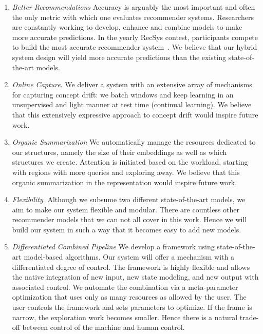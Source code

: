 \begin{enumerate}
    \item \emph{Better Recommendations}
    Accuracy is arguably the most important and often the only metric with which one evaluates recommender systems. Researchers are constantly working to develop, enhance and combine models to make more accurate predictions. In the yearly RecSys contest, participants compete to build the most accurate recommender system~\cite{recsyschallenge}.
    We believe that our hybrid system design will yield more accurate predictions than the existing state-of-the-art models.


    \item \emph{Online Capture}. We deliver a system with an extensive array of mechanisms for capturing concept drift: we batch windows and keep learning in an unsupervised and light manner at test time (continual learning).
    We believe that this extensively expressive approach to concept drift would inspire future work.


    \item \emph{Organic Summarization} We automatically manage the resources dedicated to our structures, namely the size of their embeddings as well as which structures we create. Attention is initiated based on the workload, starting with regions with more queries and exploring away.
    We believe that this organic summarization in the representation would inspire future work.
    
    
    \item \emph{Flexibility}.
    Although we subsume two different state-of-the-art models, we aim to make our system flexible and modular. There are countless other recommender models that we can not all cover in this work. Hence we will build our system in such a way that it becomes easy to add new models.
    
    
    \item \emph{Differentiated Combined Pipeline} We develop a framework using state-of-the-art model-based algorithms. Our system will offer a mechanism with a differentiated degree of control. The framework is highly flexible and allows the native integration of new input, new state modeling, and new output with associated control. We automate the combination via a meta-parameter optimization that uses only as many resources as allowed by the user. The user controls the framework and sets parameters to optimize. If the frame is narrow, the exploration work becomes smaller. Hence there is a natural trade-off between control of the machine and human control.

\end{enumerate}